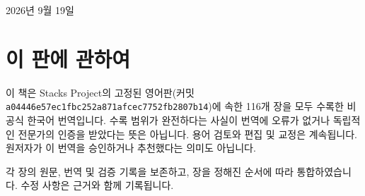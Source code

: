 

\frontmatter
\begin{titlepage}\thispagestyle{empty}\centering
{}
\vspace{8mm}{\Large 전116장 누적판\par}
\vspace{5mm}{\large Korean Cumulative Edition\par}
\vfill{\large 2026년 9월 19일\par}
\vspace{4mm}{\small 비공식 번역. 편집 및 교정 작업은 계속됩니다.\par}
\end{titlepage}
\chapter*{이 판에 관하여}
이 책은 Stacks Project의 고정된 영어판(커밋 \texttt{a04446e57ec1fbc252a871afcec7752fb2807b14})에 속한 116개 장을 모두 수록한 비공식 한국어 번역입니다. 수록 범위가 완전하다는 사실이 번역에 오류가 없거나 독립적인 전문가의 인증을 받았다는 뜻은 아닙니다. 용어 검토와 편집 및 교정은 계속됩니다. 원저자가 이 번역을 승인하거나 추천했다는 의미도 아닙니다.

각 장의 원문, 번역 및 검증 기록을 보존하고, 장을 정해진 순서에 따라 통합하였습니다. 수정 사항은 근거와 함께 기록됩니다.

